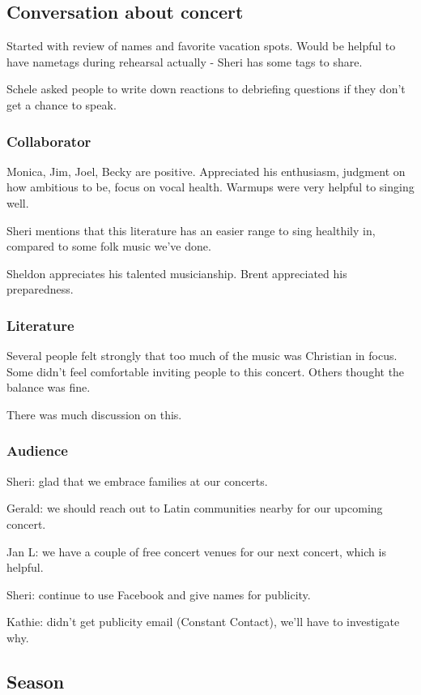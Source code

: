 \documentclass[11pt]{article}
\begin{document}
\subsection{Conversation about concert}
\label{sec-2-2}


Started with review of names and favorite vacation spots.  Would be
helpful to have nametags during rehearsal actually - Sheri has some
tags to share.

Schele asked people to write down reactions to debriefing questions if
they don't get a chance to speak.
\subsubsection{Collaborator}
\label{sec-2-2-1}


Monica, Jim, Joel, Becky are positive.  Appreciated his enthusiasm,
judgment on how ambitious to be, focus on vocal health.  Warmups were
very helpful to singing well.

Sheri mentions that this literature has an easier range to sing
healthily in, compared to some folk music we've done.

Sheldon appreciates his talented musicianship.  Brent appreciated his
preparedness.
\subsubsection{Literature}
\label{sec-2-2-2}


Several people felt strongly that too much of the music was Christian
in focus.  Some didn't feel comfortable inviting people to this
concert.  Others thought the balance was fine.

There was much discussion on this.
\subsubsection{Audience}
\label{sec-2-2-3}


Sheri: glad that we embrace families at our concerts.

Gerald: we should reach out to Latin communities nearby for our
upcoming concert.

Jan L: we have a couple of free concert venues for our next concert,
which is helpful.

Sheri: continue to use Facebook and give names for publicity.

Kathie: didn't get publicity email (Constant Contact), we'll have to
investigate why.
\subsection{Season}
\label{sec-2-3}
\end{document}
